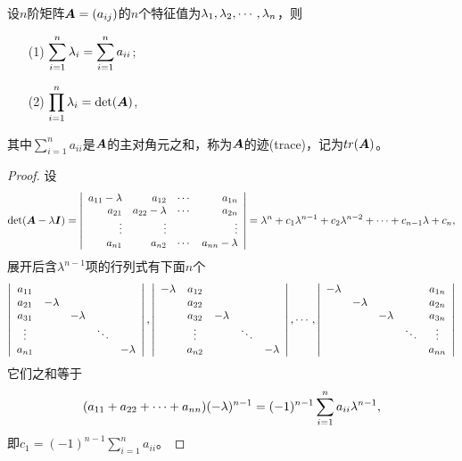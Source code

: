 \begin{dingli}
  设$n$阶矩阵$\boldsymbol{A}=(a_{ij})$的$n$个特征值为$\lambda_1,\lambda_2,\cdots,\lambda_n$，则
  \begin{itemize}
  \item[(1)] $\displaystyle \sum_{i=1}^n\lambda_i=\sum_{i=1}^na_{ii}$;
  \item[(2)] $\displaystyle \prod_{i=1}^n\lambda_i=\det(\boldsymbol{A})$,         
  \end{itemize}
  其中$\sum_{i=1}^na_{ii}$是$\boldsymbol{A}$的主对角元之和，称为$\boldsymbol{A}$的迹(trace)，记为$tr(\boldsymbol{A})$。
\end{dingli}
\begin{proof}
  设
  $$
  \det(\boldsymbol{A}-\lambda\boldsymbol{I})=\left|
    \begin{array}{rrrr}
      a_{11}-\lambda&a_{12}&\cdots&a_{1n}\\
      a_{21}&a_{22}-\lambda&\cdots&a_{2n}\\
      \vdots&\vdots&&\vdots\\
      a_{n1}&a_{n2}&\cdots&a_{nn}-\lambda
    \end{array}
    \right|=\lambda^n+c_1\lambda^{n-1}+c_2\lambda^{n-2}+\cdots+c_{n-1}\lambda+c_n,
    $$
    展开后含$\lambda^{n-1}$项的行列式有下面$n$个
    $$
    \left|
    \begin{array}{ccccc}
      a_{11}&&&&\\
      a_{21}&-\lambda&&&\\
      a_{31}&&-\lambda&&\\
      \vdots&&&\ddots&\\
      a_{n1}&&&&-\lambda
    \end{array}
  \right|,
  \left|
    \begin{array}{ccccc}
      -\lambda&a_{12}&&&\\
              &a_{22}&&&\\
              &a_{32}&-\lambda&&\\
              &\vdots&&\ddots&\\
              &a_{n2}&&&-\lambda
    \end{array}
  \right|,\cdots,
  \left|
    \begin{array}{ccccc}
      -\lambda&&&&a_{1n}\\
             &-\lambda&&&a_{2n}\\
             &&-\lambda&&a_{3n}\\
             &&&\ddots&\vdots\\
             &&&&a_{nn}
    \end{array}
  \right|
  $$
  它们之和等于
  $$
  (a_{11}+a_{22}+\cdots+a_{nn})(-\lambda)^{n-1}=(-1)^{n-1}\sum_{i=1}^na_{ii}\lambda^{n-1},
  $$
  即$c_1=(-1)^{n-1}\sum_{i=1}^na_{ii}$。


\end{proof}
